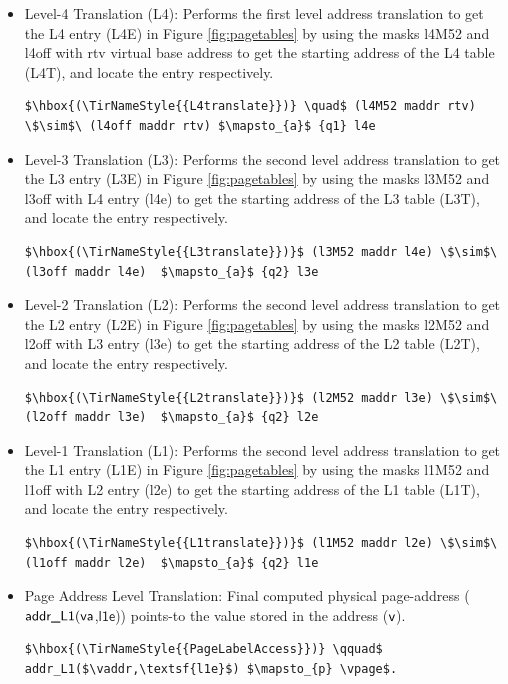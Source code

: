 \begin{itemize}
  \item Level-4 Translation (L4): Performs the first level address translation to get the L4 entry (L4E) in Figure \ref{fig:pagetables} by using the masks l4M52 and l4off with \textsf{rtv} virtual base address to get the starting address of the L4 table (L4T), and locate the entry respectively.
    \begin{lstlisting}[language=Coq]
      $\hbox{(\TirNameStyle{{L4translate}})} \quad$ (l4M52 maddr rtv) \$\sim$\ (l4off maddr rtv) $\mapsto_{a}$ {q1} l4e 
    \end{lstlisting}
 \item Level-3 Translation (L3): Performs the second level address translation to get the L3 entry (L3E) in Figure \ref{fig:pagetables} by using the masks l3M52 and l3off with L4 entry (l4e) to get the starting address of the L3 table (L3T), and locate the entry respectively.
    \begin{lstlisting}[language=Coq]
    $\hbox{(\TirNameStyle{{L3translate}})}$ (l3M52 maddr l4e) \$\sim$\ (l3off maddr l4e)  $\mapsto_{a}$ {q2} l3e
    \end{lstlisting}
  \item Level-2 Translation (L2): Performs the second level address translation to get the L2 entry (L2E) in Figure \ref{fig:pagetables} by using the masks l2M52 and l2off with L3 entry (l3e) to get the starting address of the L2 table (L2T), and locate the entry respectively.
\begin{lstlisting}[language=Coq]
    $\hbox{(\TirNameStyle{{L2translate}})}$ (l2M52 maddr l3e) \$\sim$\ (l2off maddr l3e)  $\mapsto_{a}$ {q2} l2e
    \end{lstlisting}
  \item Level-1 Translation (L1): Performs the second level address translation to get the L1 entry (L1E) in Figure \ref{fig:pagetables} by using the masks l1M52 and l1off with L2 entry (l2e) to get the starting address of the L1 table (L1T), and locate the entry respectively.
   \begin{lstlisting}[language=Coq]
    $\hbox{(\TirNameStyle{{L1translate}})}$ (l1M52 maddr l2e) \$\sim$\ (l1off maddr l2e)  $\mapsto_{a}$ {q2} l1e
    \end{lstlisting}
  \item Page Address Level Translation: Final computed physical page-address ($\textsf{addr\_L1}(\mathsf{va}$,$\textsf{l1e}$)) points-to the value stored in the address ($\textsf{v}$).
   \begin{lstlisting}[language=Coq]
    $\hbox{(\TirNameStyle{{PageLabelAccess}})} \qquad$ addr_L1($\vaddr,\textsf{l1e}$) $\mapsto_{p} \vpage$.
    \end{lstlisting} 
\end{itemize}
